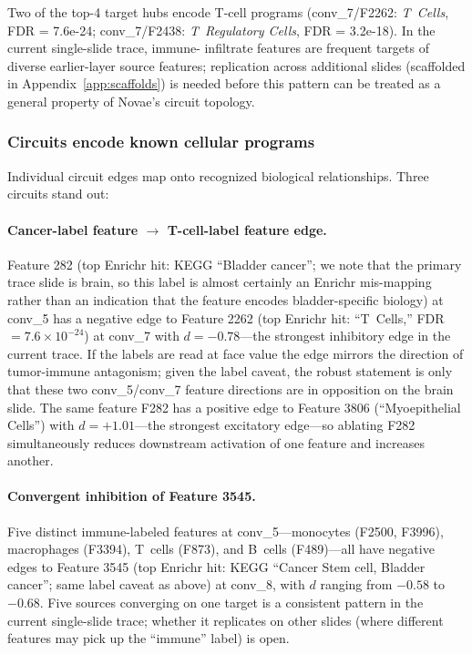 \documentclass[11pt]{article}
\begin{document}
Two of the top-4 target hubs encode T-cell programs (conv\_7/F2262:
\emph{T~Cells}, FDR = 7.6e-24; conv\_7/F2438: \emph{T~Regulatory
Cells}, FDR = 3.2e-18). In the current single-slide trace, immune-
infiltrate features are frequent targets of diverse earlier-layer
source features; replication across additional slides (scaffolded in
Appendix~\ref{app:scaffolds}) is needed before this pattern can be
treated as a general property of Novae's circuit topology.

\subsubsection{Circuits encode known cellular programs}

Individual circuit edges map onto recognized biological relationships.
Three circuits stand out:

\paragraph{Cancer-label feature $\to$ T-cell-label feature edge.}
Feature 282 (top Enrichr hit: KEGG ``Bladder cancer''; we note that
the primary trace slide is brain, so this label is almost certainly
an Enrichr mis-mapping rather than an indication that the feature
encodes bladder-specific biology) at conv\_5 has a negative edge to
Feature 2262 (top Enrichr hit: ``T~Cells,'' FDR $= 7.6\!\times\!10^{-24}$)
at conv\_7 with $d = -0.78$---the strongest inhibitory edge in the
current trace. If the labels are read at face value the edge mirrors
the direction of tumor-immune antagonism; given the label caveat, the
robust statement is only that these two conv\_5/conv\_7 feature
directions are in opposition on the brain slide. The same feature
F282 has a positive edge to Feature 3806 (``Myoepithelial Cells'')
with $d = +1.01$---the strongest excitatory edge---so ablating F282
simultaneously reduces downstream activation of one feature and
increases another.

\paragraph{Convergent inhibition of Feature 3545.}
Five distinct immune-labeled features at conv\_5---monocytes (F2500,
F3996), macrophages (F3394), T~cells (F873), and B~cells (F489)---all
have negative edges to Feature 3545 (top Enrichr hit: KEGG ``Cancer
Stem cell, Bladder cancer''; same label caveat as above) at conv\_8,
with $d$ ranging from $-0.58$ to $-0.68$. Five sources converging on
one target is a consistent pattern in the current single-slide trace;
whether it replicates on other slides (where different features may
pick up the ``immune'' label) is open.
\end{document}
